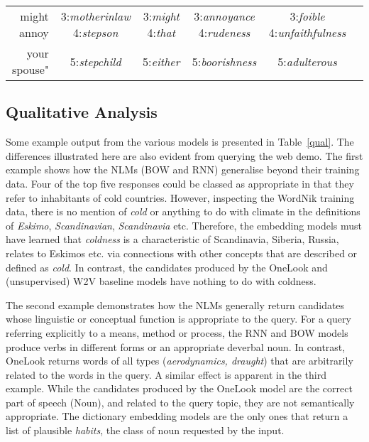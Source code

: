 \begin{table*}[ht]
{\begin{tabular}{r|ccccc|}
might annoy & 3:\emph{motherinlaw} 4:\emph{stepson} &   3:\emph{might} 4:\emph{that}  & 3:\emph{annoyance} 4:\emph{rudeness} & 3:\emph{foible} 4:\emph{unfaithfulness}\\
 your spouse" & 5:\emph{stepchild} &  5:\emph{either} &  5:\emph{boorishness} &  5:\emph{adulterous} \\

\end{tabular}}
\hfill{}
\caption{The top-five candidates for example queries (invented by the authors) from different reverse dictionary models. Both the RNN and BOW models are without Word2Vec input and use the cosine loss.}
\label{qual}
\end{table*}

\subsection{Qualitative Analysis}

Some example output from the various models is presented in Table~\ref{qual}. The differences illustrated here are also evident from querying the web demo. The first example shows how the NLMs (BOW and RNN) generalise beyond their training data. Four of the top five responses could be classed as appropriate in that they refer to inhabitants of cold countries. However, inspecting the WordNik training data, there is no mention of \emph{cold} or anything to do with climate in the definitions of \emph{Eskimo}, \emph{Scandinavian}, \emph{Scandinavia} etc. Therefore, the embedding models must have learned that \emph{coldness} is a characteristic of Scandinavia, Siberia, Russia, relates to Eskimos etc. via connections with other concepts that are described or defined as \emph{cold}. In contrast, the candidates produced by the OneLook and (unsupervised) W2V baseline models have nothing to do with coldness.

The second example demonstrates how the NLMs generally return candidates whose linguistic or conceptual function is appropriate to the query. For a query referring explicitly to a means, method or process, the RNN and BOW models produce verbs in different forms or an appropriate deverbal noun. In contrast, OneLook returns words of all types (\emph{aerodynamics, draught}) that are arbitrarily related to the words in the query. A similar effect  is apparent in the third example. While the candidates produced by the OneLook model are the correct part of speech (Noun), and related to the query topic, they are not semantically appropriate. The dictionary embedding models are the only ones that return a list of plausible \emph{habits}, the class of noun requested by the input.  

